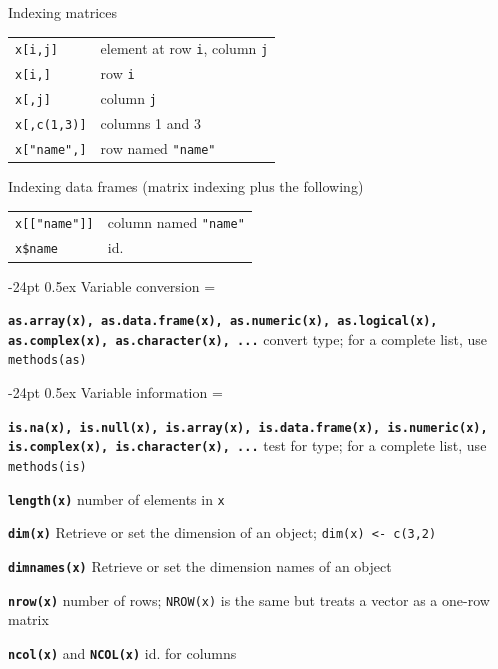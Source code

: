 \documentclass[10pt,landscape]{article}
\makeatletter
\renewcommand\section{\@startsection{section}{1}{0mm}%
                                     {-24pt}%
                                     {0.5ex}%
                                {\color{blue}\normalfont\large\bfseries}}
\newcommand{\code}{\texttt}
\newcommand{\bcode}[1]{\texttt{\textbf{#1}}}
\makeatother
\begin{document}
\begin{multicols}{3}
Indexing matrices

\begin{tabular}{@{}l@{\ }l}
\code{x[i,j]} & element at row \code{i}, column \code{j}\\
\code{x[i,]} & row \code{i}\\
\code{x[,j]} & column \code{j}\\
\code{x[,c(1,3)]} & columns 1 and 3\\
\code{x["name",]} & row named \code{"name"}\\
\end{tabular}

Indexing data frames (matrix indexing plus the following)

\begin{tabular}{@{}l@{\ }l}
\code{x[["name"]]} & column named \code{"name"}\\
\code{x\$name} & id.\\
\end{tabular}





\section{Variable conversion} 
\everypar={\hangindent=9mm}

\bcode{as.array(x), as.data.frame(x), as.numeric(x), as.logical(x),
  as.complex(x), as.character(x), ...} convert type; for a complete list,
  use \code{methods(as)}




\section{Variable information} 
\everypar={\hangindent=9mm}

\bcode{is.na(x), is.null(x), is.array(x), is.data.frame(x), is.numeric(x),
  is.complex(x), is.character(x), ...} test for type; for a complete list,
  use \code{methods(is)}

\bcode{length(x)}  number of elements in \code{x}

\bcode{dim(x)} Retrieve or set the dimension of an object;
\code{dim(x) <- c(3,2)}

\bcode{dimnames(x)} Retrieve or set the dimension names of an object

\bcode{nrow(x)} number of rows; \code{NROW(x)} is the same but treats
a vector as a one-row matrix

\bcode{ncol(x)} and \bcode{NCOL(x)} id. for columns


\end{multicols}
\end{document}
